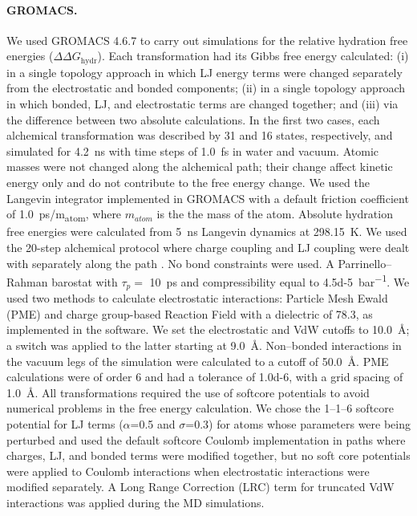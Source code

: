 \documentclass[journal=jctcce,manuscript=article]{achemso}
\begin{document}
\paragraph{GROMACS.} We used GROMACS 4.6.7 to carry out simulations for 
the relative hydration free energies ($\Delta \Delta G_{\mathrm{hydr}}$).
Each transformation had its Gibbs free energy calculated: (i) in a single 
topology approach in which LJ energy terms were changed separately 
from the electrostatic and bonded components; (ii) in a single topology 
approach in which bonded, LJ, and electrostatic terms are changed 
together;  and (iii) via the difference between two absolute calculations.
In the first two cases, each alchemical transformation was described by 31 and 
16 states, respectively, and simulated for \SI{4.2}{ns} with time steps of 
\SI{1.0}{fs} in water and vacuum. Atomic masses were not changed along the 
alchemical path; their change affect kinetic energy only and do not 
contribute to the free energy change. 
We used the Langevin integrator implemented in GROMACS with a 
default friction coefficient of \SI{1.0}{ps/m_{atom}}, where $m_{atom}$
is the the mass of the atom.  Absolute hydration 
free energies were calculated from \SI{5}{ns} Langevin dynamics
at \SI{298.15}{K}. We used the 20-step alchemical protocol where 
charge coupling and LJ coupling were dealt with separately 
along the path \cite{Mobley2014, doi:10.1021/acs.jced.7b00104}.
No bond constraints were used. 
A Parrinello--Rahman barostat with $\tau_p =$ \SI{10}{ps} and compressibility 
equal to \SI{4.5d-5}{bar^{-1}}.
We used two methods to calculate electrostatic interactions: Particle Mesh 
Ewald (PME) and charge group-based Reaction Field with a dielectric of 78.3, 
as implemented in the software. 
We set the electrostatic and VdW cutoffs to \SI{10.0}{\angstrom};
a switch was applied to the latter starting at \SI{9.0}{\angstrom}. 
Non--bonded interactions in the vacuum legs of the simulation were calculated
to a cutoff of \SI{50.0}{\angstrom}. 
PME calculations were of order 6 and had a 
tolerance of \num{1.0d-6}, with a grid spacing of \SI{1.0}{\angstrom}. 
All transformations required the use of softcore potentials to avoid numerical 
problems in the free energy calculation.  We chose the 1--1--6 softcore 
potential for LJ terms ($\alpha$=0.5 and $\sigma$=0.3) for
atoms whose parameters were being perturbed
and used the default softcore Coulomb implementation in paths where 
charges, LJ, and bonded terms were modified together, 
but no soft core potentials were applied to Coulomb interactions when 
electrostatic interactions were modified separately.  A Long Range Correction (LRC) term for truncated VdW interactions was applied during the MD simulations. 
\end{document}
